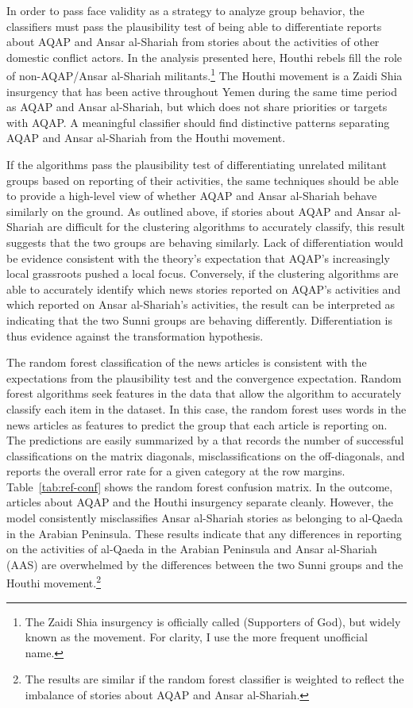In order to pass face validity as a strategy to analyze group behavior, the classifiers must pass the plausibility test of being able to differentiate reports about AQAP and Ansar al-Shariah from stories about the activities of other domestic conflict actors. In the analysis presented here,  Houthi rebels fill the role of non-AQAP/Ansar al-Shariah militants.\footnote{The Zaidi Shia insurgency is officially called  (Supporters of God), but widely known as the  movement. For clarity, I use the more frequent unofficial name.} The Houthi movement is a Zaidi Shia insurgency that has been active throughout Yemen during the same time period as AQAP and Ansar al-Shariah, but which does not share priorities or targets with AQAP. A meaningful classifier should find distinctive patterns separating AQAP and Ansar al-Shariah from the Houthi movement. 

If the algorithms pass the plausibility test of differentiating unrelated militant groups based on reporting of their activities, the same techniques should be able to provide a high-level view of whether AQAP and Ansar al-Shariah behave similarly on the ground. As outlined above, if stories about AQAP and Ansar al-Shariah are difficult for the clustering algorithms to accurately classify, this result suggests that the two groups are behaving similarly. Lack of differentiation would be evidence consistent with the theory's expectation that AQAP's increasingly local grassroots pushed a local focus. Conversely, if the clustering algorithms are able to accurately identify which news stories reported on AQAP's activities and which reported on Ansar al-Shariah's activities, the result can be interpreted as indicating that the two Sunni groups are behaving differently. Differentiation is thus evidence against the transformation hypothesis.

The random forest classification of the news articles is consistent with the expectations from the plausibility test and the convergence expectation.  Random forest algorithms seek features in the data that allow the algorithm to accurately classify each item in the dataset. In this case, the random forest uses words in the news articles as features to predict the group that each article is reporting on. The predictions are easily summarized by a  that records the number of successful classifications on the matrix diagonals, misclassifications on the off-diagonals, and reports the overall error rate for a given category at the row margins. Table~\ref{tab:ref-conf} shows the random forest confusion matrix. In the outcome, articles about AQAP and the Houthi insurgency separate cleanly. However, the model consistently misclassifies Ansar al-Shariah stories as belonging to al-Qaeda in the Arabian Peninsula.  These results indicate that any differences in reporting on the activities of al-Qaeda in the Arabian Peninsula and Ansar al-Shariah (AAS) are overwhelmed by the differences between the two Sunni groups and the Houthi movement.\footnote{The results are similar if the random forest classifier is weighted to reflect the imbalance of stories about AQAP and Ansar al-Shariah.}

